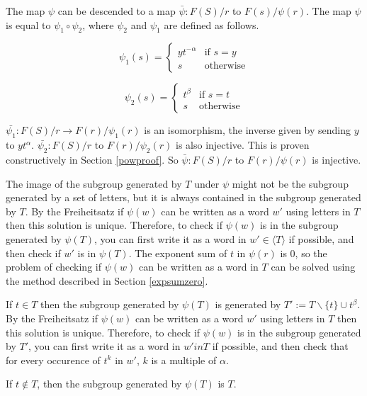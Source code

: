\documentclass[11pt]{article} %
\theoremstyle{definition}
\theoremstyle{definition}
\theoremstyle{definition}
\theoremstyle{definition}
\theoremstyle{definition}
\theoremstyle{definition}
\begin{document}
The map $\psi$ can be descended to a map $\bar{\psi} : F(S) / r$ to $F(s) / \psi(r)$. The map
$\psi$ is equal to $\psi_1 \circ \psi_2$,
where $\psi_2$ and $\psi_1$ are defined as follows.

\begin{equation}
  \psi_1(s) =
  \begin{cases}
     yt^{-\alpha} &\text{if } s = y \\
     s & \text{otherwise}
  \end{cases}
\end{equation}

\begin{equation}
  \psi_2(s) =
  \begin{cases}
     t^\beta & \text{if } s = t \\
     s & \text{otherwise}
  \end{cases}
\end{equation}

$\bar{\psi_1} : F(S) / r \to F(r) / \psi_1(r)$ is an isomorphism,
the inverse given by sending $y$ to $yt^\alpha$.
$\bar{\psi_2} : F(S) / r$ to $F(r) / \psi_2(r)$
is also injective.
This is proven constructively in Section \ref{powproof}.
So $\bar{\psi} : F(S) / r$ to $F(r) / \psi(r)$ is injective.

The image of the subgroup generated
by $T$ under $\psi$ might not be the subgroup generated by a set of letters, but it is
always contained in the subgroup generated by $T$.
By the Freiheitsatz if $\psi(w)$ can be written
as a word $w'$ using letters in $T$ then this solution is unique.
Therefore, to check if $\psi(w)$ is in the subgroup generated by
$\psi(T)$, you can first write it as a word in $w' \in \langle T \rangle$ if possible,
and then check if $w'$ is in $\psi(T)$.
The exponent sum of $t$ in $\psi(r)$ is $0$, so the problem of checking
if $\psi(w)$ can be written as a word in $T$ can be solved using
the method described in Section \ref{expsumzero}.

If $t \in T$ then the subgroup generated by $\psi(T)$ is generated by
$T' := T \backslash \{t\} \cup t^\beta$. By the Freiheitsatz if $\psi(w)$ can be written
as a word $w'$ using letters in $T$ then this solution is unique. Therefore,
to check if $\psi(w)$ is in the subgroup generated by $T'$, you can first
write it as a word in $w' in T$ if possible, and then check that for every
occurence of $t^k$ in $w'$, $k$ is a multiple of $\alpha$.

If $t \notin T$, then the subgroup generated by $\psi(T)$ is $T$.
\end{document}
